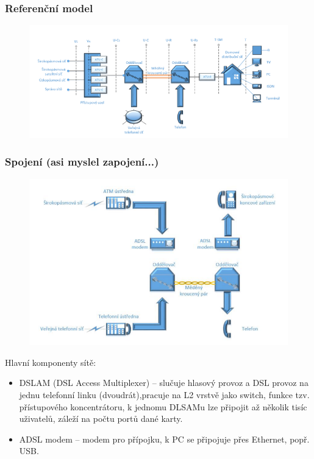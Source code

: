 \subsubsection{Referenční model}
\begin{figure} [h]
    \centering
    \includegraphics[scale=0.85]{snimky/ADSL model.png}
\end{figure}
\newpage
\subsubsection{Spojení (asi myslel zapojení...)}
\begin{figure} [h]
    \centering
    \includegraphics[scale=0.8]{MPC-SKS/snimky/zapoj.png}
\end{figure}

Hlavní komponenty sítě:
\begin{itemize}
    \item DSLAM (DSL Access Multiplexer) -- slučuje hlasový provoz a DSL provoz na jednu telefonní linku (dvoudrát),pracuje na L2 vrstvě jako switch, funkce tzv. přístupového koncentrátoru, k jednomu DLSAMu lze připojit až několik tisíc uživatelů, záleží na počtu portů dané karty.
    \item ADSL modem -- modem pro přípojku, k PC se připojuje přes Ethernet, popř. USB.
\end{itemize}

